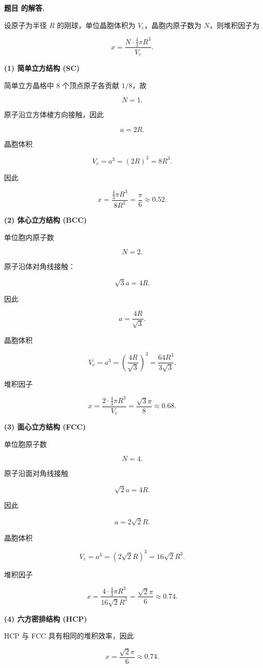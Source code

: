 \documentclass[12pt, a4paper, oneside]{ctexart}
\newcounter{problemname}
\newenvironment{solution}
  {\par\noindent\textbf{题目 \theproblemname 的解答. }}
  {\par}
\begin{document}
\begin{solution}

设原子为半径 $R$ 的刚球，单位晶胞体积为 $V_c$，晶胞内原子数为 $N$，则堆积因子为

\[
x=\frac{N \cdot \frac{4}{3}\pi R^3}{V_c}.
\]

\textbf{(1) 简单立方结构 (SC)}

简单立方晶格中 8 个顶点原子各贡献 $1/8$，故

\[
N=1.
\]

原子沿立方体棱方向接触，因此

\[
a=2R.
\]

晶胞体积

\[
V_c=a^3=(2R)^3=8R^3.
\]

因此

\[
x=\frac{\frac{4}{3}\pi R^3}{8R^3}
=\frac{\pi}{6}\approx0.52.
\]

\textbf{(2) 体心立方结构 (BCC)}

单位胞内原子数

\[
N=2.
\]

原子沿体对角线接触：

\[
\sqrt{3}a=4R.
\]

因此

\[
a=\frac{4R}{\sqrt3}.
\]

晶胞体积

\[
V_c=a^3=\left(\frac{4R}{\sqrt3}\right)^3
=\frac{64R^3}{3\sqrt3}.
\]

堆积因子

\[
x=\frac{2\cdot\frac{4}{3}\pi R^3}{V_c}
=\frac{\sqrt3\pi}{8}
\approx0.68.
\]

\textbf{(3) 面心立方结构 (FCC)}

单位胞原子数

\[
N=4.
\]

原子沿面对角线接触

\[
\sqrt2 a=4R.
\]

因此

\[
a=2\sqrt2 R.
\]

晶胞体积

\[
V_c=a^3=(2\sqrt2R)^3=16\sqrt2R^3.
\]

堆积因子

\[
x=\frac{4\cdot\frac{4}{3}\pi R^3}{16\sqrt2R^3}
=\frac{\sqrt2\pi}{6}
\approx0.74.
\]

\textbf{(4) 六方密排结构 (HCP)}

HCP 与 FCC 具有相同的堆积效率，因此

\[
x=\frac{\sqrt2\pi}{6}\approx0.74.
\]


\end{solution}
\end{document}
